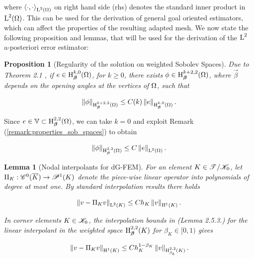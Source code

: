 \documentclass[a4paper,11pt]{article}
\newtheorem{lemma}[theorem]{Lemma}
\newtheorem{props}[theorem]{Proposition}
\begin{document}
where $\left\langle{\cdot,\cdot}\right\rangle_{\operatorname L^{2}(\Omega)}$ on right hand side (rhs) denotes the standard inner product in $\operatorname L^{2}(\Omega)$. This can be used for the derivation of general goal oriented estimators, which can affect the properties of the resulting adapted mesh. We now state the following proposition and lemmas, that will be used for the derivation of the $\operatorname L^{2}$ a-posteriori error estimator:

\begin{props}[Regularity of the solution on weighted Sobolev Spaces]
\label{prop:regularity_dual}
Due to Theorem 2.1 \cite{BG:1988}, if $e \in \operatorname H^{k,0}_{\boldsymbol \beta}(\Omega)$, for $k\geq 0$, there exists $\phi \in \operatorname H^{k+2,2}_{\boldsymbol \beta}(\Omega)$, where $\vec{\beta}$ depends on the opening angles at the vertices of $\Omega$, such that 

\begin{equation}
    \left\|\phi\right\|_{\operatorname H^{k+2,2}_{\boldsymbol \beta}(\Omega)} \leq  C(k) \left\|e\right\|_{\operatorname H^{k,0}_{\boldsymbol \beta}(\Omega)}.
\label{eq:regularity-dual-problem}
\end{equation}
\end{props}

Since $e \in \mathbb V \subset \operatorname H^{2,2}_{\boldsymbol \beta}(\Omega)$, we can take $k = 0$ and exploit Remark (\ref{remark:properties_sob_spaces}) to obtain 

\begin{equation}
    \left\|\phi\right\|_{\operatorname H^{2,2}_{\boldsymbol \beta}(\Omega)} \leq  C \left\|e\right\|_{\operatorname L^{2}(\Omega)}.
\label{eq:regularity_inequality}
\end{equation}

\begin{lemma}[Nodal interpolants for dG-FEM]
\label{lemma:nodal_interpolation}
For an element $K \in \mathscr T^{}\slash \mathscr K_{0}$, let $\Pi_{K}: \mathscr C^{0}(\overline{K}) \rightarrow \mathscr P^{1}(K)$ denote the piece-wise linear operator into polynomials of degree at most one. By standard interpolation results \cite{BS:2008} there holds

\begin{equation}
    \left\| v - \Pi_{K}v\right\|_{\operatorname L^{2}(K)} \leq C h_{K} \left\|v\right\|_{\operatorname H^{1}(K)}.
\end{equation}


In corner elements $K \in \mathscr K_{0}$, the interpolation bounds in \cite{Wihler:2003,Schwab:1998} (Lemma 2.5.3.) for the linear interpolant in the weighted space $\operatorname H^{2,2}_{\boldsymbol \beta}(K)$ for $\beta_{K} \in [0,1)$ gives

\begin{equation}
      \left\| v - \Pi_{K}v\right\|_{\operatorname H^{1}(K)} \leq C h_{K}^{1-\beta_{K}} \left\|v\right\|_{\operatorname H^{2,2}_{\beta_{k}}(K)}.
\end{equation}

\end{lemma}
\end{document}
